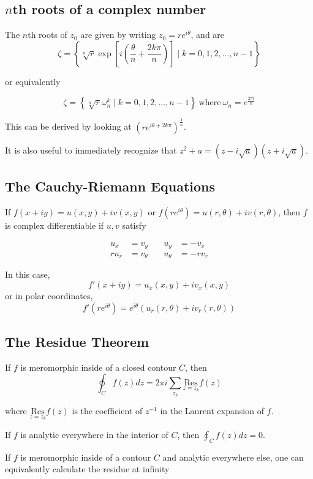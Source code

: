 \documentclass{article}
\begin{document}
\subsection{$n$th roots of a complex number}
The $n$th roots of $z_0$ are given by writing $z_0 = re^{i\theta}$, and are 
\[\zeta = \left\{ \sqrt[n]{r} \exp\left[{i\left( \frac{\theta}{n} + \frac{2k\pi}{n}\right)}\right] \mid k = 0,1,2,\ldots, n-1\right\}\]

or equivalently

\[\zeta = \left\{ \sqrt[n]{r}\omega_n^k \mid k = 0,1,2,\ldots, n-1\right\}~\text{where}~\omega_n = e^{\frac{2\pi i}{n}}\]

This can be derived by looking at $\left( re^{i\theta + 2k\pi}\right)^{\frac{1}{n}}$.

It is also useful to immediately recognize that $z^2+a = (z-i\sqrt{a})(z+i\sqrt{a})$.

\subsection{The Cauchy-Riemann Equations}

If $f(x+iy) = u(x,y) + iv(x,y)$ or $f(re^{i\theta}) = u(r,\theta) + iv(r,\theta)$, then $f$ is complex differentiable if $u,v$ satisfy 

\begin{align*}
    u_x &= v_y &\quad u_y &= -v_x \\
    r u_r &= v_\theta &\quad u_\theta &= -r v_r
\end{align*}

In this case, 
\[
f'(x+iy) = u_x(x,y) + iv_x(x,y)
\] 
or in polar coordinates, 
\[
f'(re^{i\theta}) = e^{i\theta}(u_r(r,\theta) + iv_r(r,\theta))
\]

\subsection{The Residue Theorem}


If $f$ is meromorphic inside of a closed contour $C$, then
\[ 
\oint_C f(z) dz = 2\pi i \sum_{z_k} \underset{z=z_k}{\text{Res}} f(z)
\]

where $\underset{z=z_k}{\text{Res}} f(z)$ is the coefficient of $z^{-1}$ in the Laurent expansion of $f$.

If $f$ is analytic everywhere in the interior of $C$, then $\oint_C f(z) dz = 0$.


If $f$ is meromorphic inside of a contour $C$ and analytic everywhere else, one can equivalently calculate the residue at infinity
\end{document}

